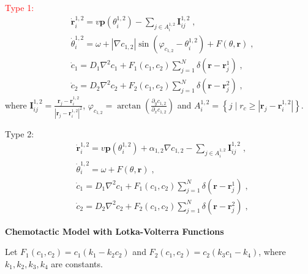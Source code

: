 \documentclass{article}
\begin{document}
\noindent\textcolor{red}{Type 1:}
\begin{subequations}
    \begin{align}
        &\dot{\mathbf{r}}_{i}^{1,2}=v\mathbf{p}\left( \theta _{i}^{1,2} \right) -\sum_{j\in A_{i}^{1,2}}{\mathbf{I}_{ij}^{1,2}\;,}\\
        &\dot{\theta}_{i}^{1,2}=\omega + \left| \nabla c_{1,2} \right|\sin \left( \varphi _{c_{1,2}}-\theta _{i}^{1,2} \right) +F\left( \theta ,\mathbf{r} \right) \;,\\
        &\dot{c}_1=D_1\nabla ^2c_1+F_1\left( c_1,c_2 \right) \sum_{j=1}^N{\delta \left( \mathbf{r}-\mathbf{r}_{j}^{1} \right) \;,}\\
        &\dot{c}_2=D_2\nabla ^2c_2+F_2\left( c_1,c_2 \right) \sum_{j=1}^N{\delta \left( \mathbf{r}-\mathbf{r}_{j}^{2} \right) \;,}
    \end{align}
\end{subequations}
where $\mathbf{I}_{ij}^{1,2}=\frac{\mathbf{r}_j-\mathbf{r}_{i}^{1,2}}{|\mathbf{r}_j-\mathbf{r}_{i}^{1,2}|^{2}}$, $\varphi _{c_{1,2}}=\arctan \left( \frac{\partial _yc_{1,2}}{\partial _xc_{1,2}} \right) $ and $A_{i}^{1,2}=\left\{ j\mid r_c\geqslant | \mathbf{r}_j-\mathbf{r}_{i}^{1,2} | \right\}$.

\noindent Type 2:
\begin{subequations}
    \begin{align}
        &\dot{\mathbf{r}}_{i}^{1,2}=v\mathbf{p}\left( \theta _{i}^{1,2} \right) +\alpha _{1,2}\nabla c_{1,2}-\sum_{j\in A_{i}^{1,2}}{\mathbf{I}_{ij}^{1,2}\;,}\\
        &\dot{\theta}_{i}^{1,2}=\omega + F\left( \theta ,\mathbf{r} \right) \;,\\
        &\dot{c}_1=D_1\nabla ^2c_1+F_1\left( c_1,c_2 \right) \sum_{j=1}^N{\delta \left( \mathbf{r}-\mathbf{r}_{j}^{1} \right) \;,}\\
        &\dot{c}_2=D_2\nabla ^2c_2+F_2\left( c_1,c_2 \right) \sum_{j=1}^N{\delta \left( \mathbf{r}-\mathbf{r}_{j}^{2} \right) \;,}
    \end{align}
\end{subequations}

\noindent\textbf{Chemotactic Model with Lotka-Volterra Functions}

Let $F_1\left( c_1,c_2 \right)=c_1\left( k_1-k_2c_2 \right)$ and $F_2\left( c_1,c_2 \right)=c_2\left( k_3c_1-k_4 \right)$, where $k_1,k_2,k_3,k_4$ are constants.
\end{document}
